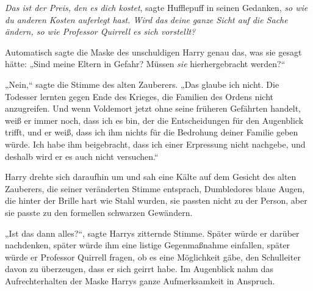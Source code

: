 \emph{Das ist der Preis,} \emph{den es dich kostet}, sagte Hufflepuff in seinen Gedanken, \emph{so wie} \emph{du anderen Kosten auferlegt hast. Wird das} \emph{deine} \emph{ganze Sicht auf die Sache ändern, so wie Professor Quirrell es sich vorstellt?}

Automatisch sagte die Maske des unschuldigen Harry genau das, was sie gesagt hätte: „Sind meine Eltern in Gefahr? Müssen \emph{sie} hierhergebracht werden?“

„Nein,“ sagte die Stimme des alten Zauberers. „Das glaube ich nicht. Die Todesser lernten gegen Ende des Krieges, die Familien des Ordens nicht anzugreifen. Und wenn Voldemort jetzt ohne seine früheren Gefährten handelt, weiß er immer noch, dass ich es bin, der die Entscheidungen für den Augenblick trifft, und er weiß, dass ich ihm nichts für die Bedrohung deiner Familie geben würde. Ich habe ihm beigebracht, dass ich einer Erpressung nicht nachgebe, und deshalb wird er es auch nicht versuchen.“

Harry drehte sich daraufhin um und sah eine Kälte auf dem Gesicht des alten Zauberers, die seiner veränderten Stimme entsprach, Dumbledores blaue Augen, die hinter der Brille hart wie Stahl wurden, sie passten nicht zu der Person, aber sie passte zu den formellen schwarzen Gewändern.

„Ist das dann alles?“, sagte Harrys zitternde Stimme. Später würde er darüber nachdenken, später würde ihm eine listige Gegenmaßnahme einfallen, später würde er Professor Quirrell fragen, ob es eine Möglichkeit gäbe, den Schulleiter davon zu überzeugen, dass er sich geirrt habe. Im Augenblick nahm das Aufrechterhalten der Maske Harrys ganze Aufmerksamkeit in Anspruch.

